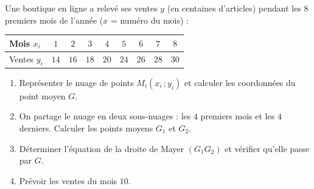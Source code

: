 
Une boutique en ligne a relevé ses ventes $y$ (en centaines d'articles) pendant les $8$ premiers mois de l'année ($x$ = numéro du mois) :

\begin{center}
\begin{tabular}{|l|c|c|c|c|c|c|c|c|}
\hline
Mois $x_i$ & $1$ & $2$ & $3$ & $4$ & $5$ & $6$ & $7$ & $8$ \\ \hline
Ventes $y_i$ & $14$ & $16$ & $18$ & $20$ & $24$ & $26$ & $28$ & $30$ \\ \hline
\end{tabular}
\end{center}

\begin{enumerate}
  \item Représenter le nuage de points $M_i(x_i\,;y_i)$ et calculer les coordonnées du point moyen $G$.
  \item On partage le nuage en deux sous-nuages : les $4$ premiers mois et les $4$ derniers. Calculer les points moyens $G_1$ et $G_2$.
  \item Déterminer l'équation de la droite de Mayer $(G_1G_2)$ et vérifier qu'elle passe par $G$.
  \item Prévoir les ventes du mois $10$.
\end{enumerate}

